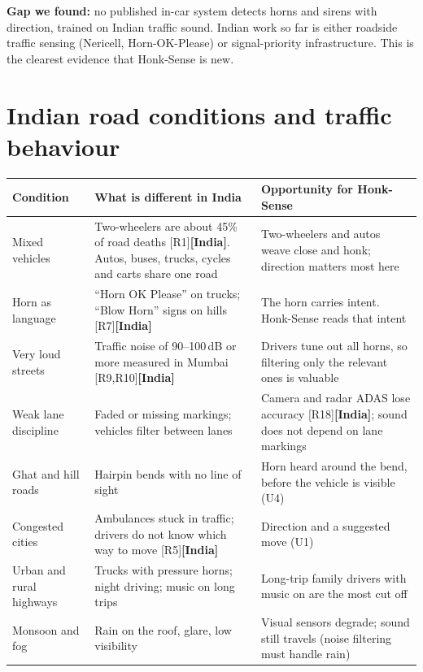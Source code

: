 \documentclass[11pt]{article}
\newcommand{\IN}{{\color{sky}\bfseries[India]}}
\renewcommand{\cite}[1]{{\color{navy}[#1]}}
\begin{document}
{\small\color{muted}\textbf{Gap we found:} no published in-car system detects horns and sirens with direction, trained on Indian traffic sound. Indian work so far is either roadside traffic sensing (Nericell, Horn-OK-Please) or signal-priority infrastructure. This is the clearest evidence that Honk-Sense is new.}

\section{Indian road conditions and traffic behaviour}
{\small\renewcommand{\arraystretch}{1.25}
\begin{tabularx}{\textwidth}{@{}p{3.4cm}XX@{}}
\toprule
\textbf{Condition} & \textbf{What is different in India} & \textbf{Opportunity for Honk-Sense} \\
\midrule
Mixed vehicles & Two-wheelers are about 45\% of road deaths \cite{R1}\IN. Autos, buses, trucks, cycles and carts share one road & Two-wheelers and autos weave close and honk; direction matters most here \\
Horn as language & ``Horn OK Please'' on trucks; ``Blow Horn'' signs on hills \cite{R7}\IN & The horn carries intent. Honk-Sense reads that intent \\
Very loud streets & Traffic noise of 90--100\,dB or more measured in Mumbai \cite{R9,R10}\IN & Drivers tune out all horns, so filtering only the relevant ones is valuable \\
Weak lane discipline & Faded or missing markings; vehicles filter between lanes & Camera and radar ADAS lose accuracy \cite{R18}\IN; sound does not depend on lane markings \\
Ghat and hill roads & Hairpin bends with no line of sight & Horn heard around the bend, before the vehicle is visible (U4) \\
Congested cities & Ambulances stuck in traffic; drivers do not know which way to move \cite{R5}\IN & Direction and a suggested move (U1) \\
Urban and rural highways & Trucks with pressure horns; night driving; music on long trips & Long-trip family drivers with music on are the most cut off \\
Monsoon and fog & Rain on the roof, glare, low visibility & Visual sensors degrade; sound still travels (noise filtering must handle rain) \\
\bottomrule
\end{tabularx}}
\end{document}
